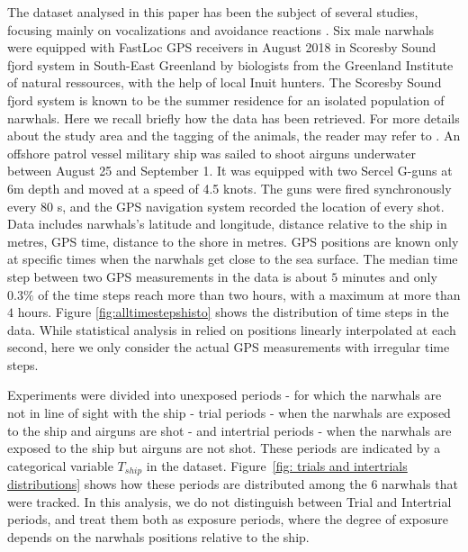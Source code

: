 \documentclass[11pt]{article}
\newcommand {\1}{\mathbb{1}}
\begin{document}
The dataset analysed in this paper has been the subject of several studies, focusing mainly on vocalizations and avoidance reactions \cite{heide-jorgensen_behavioral_2021,tervo_narwhals_2021}. 
Six male narwhals were equipped with FastLoc GPS receivers in August 2018 in Scoresby Sound fjord system in South-East Greenland by biologists from the Greenland Institute of natural ressources, with the help of local Inuit hunters. The Scoresby Sound fjord system
is known to be the summer residence for an isolated population of narwhals.
Here we recall briefly how the data has been retrieved. For more details about the study area and the tagging of the animals, the reader may refer to \cite{heide-jorgensen_behavioral_2021}. 
An offshore patrol vessel military ship was sailed to shoot airguns underwater between August 25 and September 1. It was equipped with two Sercel G-guns at 6m depth and moved at a speed of 4.5 knots. The guns were fired synchronously every 80 s, and the GPS navigation system recorded the location of every shot. 
Data includes narwhals's latitude and longitude, distance relative to the ship in metres, GPS time, distance to the shore in metres. GPS positions are known only at specific times when the narwhals get close to the sea surface. The median time step between two GPS measurements in the data is about $5$ minutes and only $0.3 \%$ of the time steps reach more than two hours, with a maximum at more than $4$ hours. Figure \ref{fig:alltimestepshisto} shows the distribution of time steps in the data. While statistical analysis in \cite{heide-jorgensen_behavioral_2021} relied on positions linearly interpolated at each second, here we only consider the actual GPS measurements with irregular time steps.



Experiments were divided into unexposed periods - for which the narwhals are not in line of sight with the ship - trial periods - when the narwhals are exposed to the ship and airguns are shot - and intertrial periods - when the narwhals are exposed to the ship but airguns are not shot. These periods are indicated by a categorical variable $T_{ship}$ in the dataset. Figure~\ref{fig: trials and intertrials distributions} shows how these periods are distributed among the $6$ narwhals that were tracked. In this analysis, we do not distinguish between Trial and Intertrial periods, and treat them both as exposure periods, where the degree of exposure depends on the narwhals positions relative to the ship.
\end{document}
